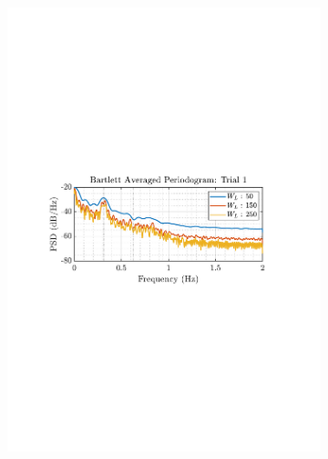 \documentclass[12pt]{article}
\numberwithin{equation}{section}
\begin{document}
\begin{figure}[H]
		\begin{subfigure}{0.49\textwidth}
			\centering
			\includegraphics[trim={2.2cm 11cm 3.15cm  11.2cm}, clip, width=\textwidth]{../MATLAB/figures/q1_5a_fig04.pdf} 
		\end{subfigure}
		\begin{subfigure}{0.49\textwidth}
			\centering

\end{subfigure}
\end{figure}
\end{document}
